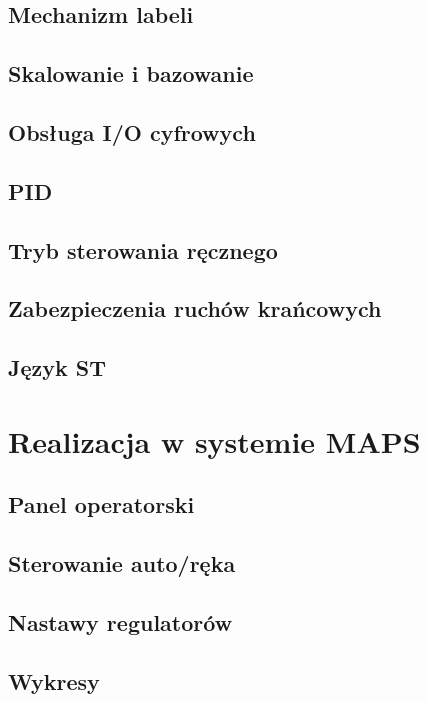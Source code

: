 \documentclass{mwrep}
\begin{document}
\section{Mechanizm labeli}
\label{PLC::Labels}

\section{Skalowanie i bazowanie}
\label{PLC::Bazowanie}

\section{Obsługa I/O cyfrowych}
\label{PLC::IOCyfrowe}

\section{PID}
\label{PLC::PID}

\section{Tryb sterowania ręcznego}
\label{PLC::Reka}

\section{Zabezpieczenia ruchów krańcowych}
\label{PLC::Krancowki}

\section{Język ST}
\label{PLC::ST}

\chapter{Realizacja w systemie MAPS}
\label{MAPS}

\section{Panel operatorski}
\label{MAPS::PanelOperatorski}

\section{Sterowanie auto/ręka}
\label{MAPS::AutoReka}

\section{Nastawy regulatorów}
\label{MAPS::Nastawy}

\section{Wykresy}
\label{MAPS::Wykresy}
\end{document}
